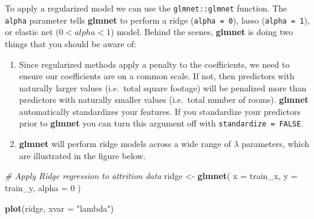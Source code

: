 \documentclass[]{book}
\newenvironment{Shaded}{\begin{snugshade}}{\end{snugshade}}
\newcommand{\CommentTok}[1]{\textcolor[rgb]{0.56,0.35,0.01}{\textit{#1}}}
\newcommand{\DataTypeTok}[1]{\textcolor[rgb]{0.13,0.29,0.53}{#1}}
\newcommand{\DecValTok}[1]{\textcolor[rgb]{0.00,0.00,0.81}{#1}}
\newcommand{\KeywordTok}[1]{\textcolor[rgb]{0.13,0.29,0.53}{\textbf{#1}}}
\newcommand{\NormalTok}[1]{#1}
\newcommand{\OperatorTok}[1]{\textcolor[rgb]{0.81,0.36,0.00}{\textbf{#1}}}
\newcommand{\StringTok}[1]{\textcolor[rgb]{0.31,0.60,0.02}{#1}}
\providecommand{\tightlist}{%
  \setlength{\itemsep}{0pt}\setlength{\parskip}{0pt}}
\theoremstyle{definition}
\theoremstyle{definition}
\theoremstyle{definition}
\theoremstyle{remark}
\begin{document}
\begin{Shaded}
\end{Shaded}

To apply a regularized model we can use the \texttt{glmnet::glmnet}
function. The \texttt{alpha} parameter tells \textbf{glmnet} to perform
a ridge (\texttt{alpha\ =\ 0}), lasso (\texttt{alpha\ =\ 1}), or elastic
net (\(0 < alpha < 1\)) model. Behind the scenes, \textbf{glmnet} is
doing two things that you should be aware of:

\begin{enumerate}
\def\labelenumi{\arabic{enumi}.}
\tightlist
\item
  Since regularized methods apply a penalty to the coefficients, we need
  to ensure our coefficients are on a common scale. If not, then
  predictors with naturally larger values (i.e.~total square footage)
  will be penalized more than predictors with naturally smaller values
  (i.e.~total number of rooms). \textbf{glmnet} automatically
  standardizes your features. If you standardize your predictors prior
  to \textbf{glmnet} you can turn this argument off with
  \texttt{standardize\ =\ FALSE}.
\item
  \textbf{glmnet} will perform ridge models across a wide range of
  \(\lambda\) parameters, which are illustrated in the figure below.
\end{enumerate}

\begin{Shaded}
\begin{Highlighting}[]
\CommentTok{# Apply Ridge regression to attrition data}
\NormalTok{ridge <-}\StringTok{ }\KeywordTok{glmnet}\NormalTok{(}
  \DataTypeTok{x =}\NormalTok{ train_x,}
  \DataTypeTok{y =}\NormalTok{ train_y,}
  \DataTypeTok{alpha =} \DecValTok{0}
\NormalTok{)}

\KeywordTok{plot}\NormalTok{(ridge, }\DataTypeTok{xvar =} \StringTok{"lambda"}\NormalTok{)}
\end{Highlighting}
\end{Shaded}
\end{document}
